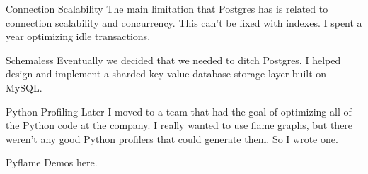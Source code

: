 \documentclass[14pt]{beamer}
\begin{document}
\begin{frame}{Connection Scalability}
  The main limitation that Postgres has is related to connection scalability and
  concurrency. This can't be fixed with indexes.
  \newline
  \newline
  I spent a year optimizing idle transactions.
\end{frame}

\begin{frame}{Schemaless}
  Eventually we decided that we needed to ditch Postgres.
  \newline
  \newline
  I helped design and implement a sharded key-value database storage layer built
  on MySQL.
\end{frame}

\begin{frame}{Python Profiling}
  Later I moved to a team that had the goal of optimizing all of the Python code
  at the company.
  \newline
  \newline
  I really wanted to use flame graphs, but there weren't any good Python
  profilers that could generate them. So I wrote one.
\end{frame}

\begin{frame}{Pyflame}
  Demos here.
\end{frame}
\end{document}
